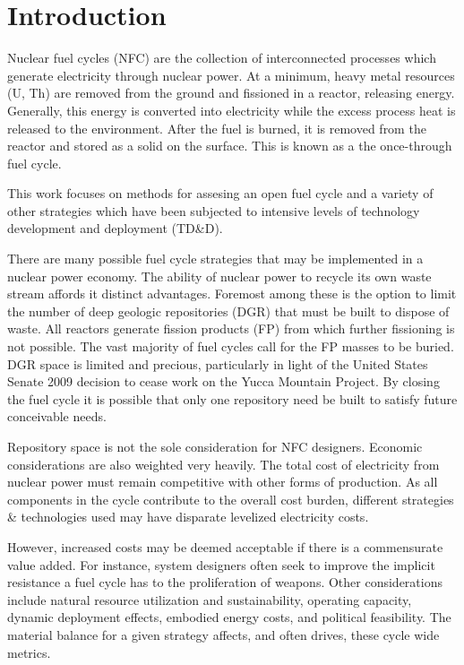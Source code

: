 \chapter{Introduction}
\label{diss_intro}

Nuclear fuel cycles (NFC) are the collection of interconnected processes which 
generate electricity through nuclear power.  
At a minimum, heavy metal resources (U, Th) are removed from the ground
and fissioned in a reactor, releasing energy.  Generally, this energy is converted 
into electricity while the excess process heat is released to the environment.  
After the fuel is burned, it is removed from the reactor and stored as a solid on the surface.
This is known as a the once-through fuel cycle.

This work focuses on methods for assesing an open fuel cycle and a variety of other 
strategies which have been subjected to intensive levels of technology development and 
deployment (TD\&D).

There are many possible fuel cycle strategies that may be implemented in a nuclear power economy.
The ability of nuclear power to recycle its own waste stream affords it distinct advantages.  
Foremost among these is the option to limit the number of deep geologic repositories (DGR) 
that must be built to dispose of waste.   All reactors generate fission products (FP) from 
which further fissioning is not possible.  The vast majority of fuel cycles call for the FP masses 
to be buried.  DGR space is limited and precious, particularly in light of the United States Senate 2009
decision to cease work on the Yucca Mountain Project.  
By closing the fuel cycle it is possible  that only one repository need be built to satisfy 
future conceivable needs.

Repository space is not the sole consideration for NFC designers.  Economic considerations 
are also weighted very heavily.  The total cost of electricity from nuclear power must remain competitive 
with other forms of production.  As all components in the cycle contribute to the overall cost burden, 
different strategies \& technologies used may have disparate levelized electricity costs.

However, increased costs may be deemed acceptable if there is a commensurate value added.
For instance, system designers often seek to improve the implicit resistance a fuel cycle 
has to the proliferation of weapons.  Other considerations include natural resource 
utilization and sustainability, operating capacity, dynamic deployment effects,
embodied energy costs, and political feasibility.  The material balance for a given strategy
affects, and often drives, these cycle wide metrics.

